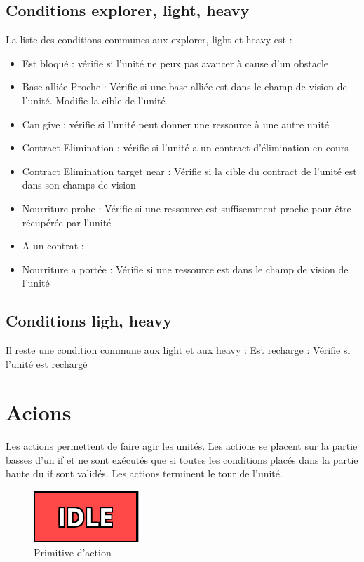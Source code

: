 \documentclass{report}
\begin{document}
\subsection{Conditions explorer, light, heavy}
La liste des conditions communes aux explorer, light et heavy est :
\begin{itemize}
\item Est bloqué : vérifie si l'unité ne peux pas avancer à cause d'un obstacle
\item Base alliée Proche : Vérifie si une base alliée est dans le champ de vision de l'unité. Modifie la cible de l'unité
\item Can give : vérifie si l'unité peut donner une ressource à une autre unité
\item Contract Elimination : vérifie si l'unité a un contract d'élimination en cours
\item Contract Elimination target near : Vérifie si la cible du contract de l'unité est dans son champs de vision
\item Nourriture prohe : Vérifie si une ressource est suffisemment proche pour être récupérée par l'unité
\item A un contrat : 
\item Nourriture a portée : Vérifie si une ressource est dans le champ de vision de l'unité
\end{itemize}
\subsection{Conditions ligh, heavy}
Il reste une condition commune aux light et aux heavy : \newline
Est recharge : Vérifie si l'unité est rechargé
\section{Acions}
\paragraph{}
Les actions permettent de faire agir les unités. Les actions se placent sur la partie basses d'un if et ne sont exécutés que si toutes les conditions placés dans la partie haute du if sont validés. Les actions terminent le tour de l'unité.
\begin{figure}[!h]
	\centering
		\includegraphics[scale=1]{action.png}
	\caption{Primitive d'action}
\end{figure}
\end{document}
